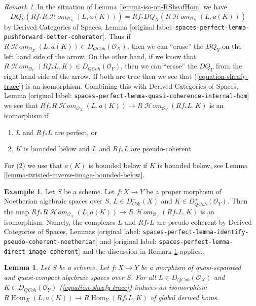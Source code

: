 \documentclass[10pt,a4paper]{article}
\theoremstyle{plain}
\newtheorem{lemma}[subsection]{Lemma}
\theoremstyle{definition}
\newtheorem{example}[subsection]{Example}
\theoremstyle{remark}
\newtheorem{remark}[subsection]{Remark}
\numberwithin{equation}{subsection}
\def\Hom{\mathop{\mathrm{Hom}}\nolimits}
\def\SheafHom{\mathop{\mathcal{H}\!\mathit{om}}\nolimits}
\def\QCoh{\mathit{QCoh}}
\begin{document}
\begin{remark}
\label{remark-iso-on-RSheafHom}
In the situation of Lemma \ref{lemma-iso-on-RSheafHom} we have
$$
DQ_Y(Rf_*R\SheafHom_{\mathcal{O}_X}(L, a(K))) =
Rf_* DQ_X(R\SheafHom_{\mathcal{O}_X}(L, a(K)))
$$
by Derived Categories of Spaces, Lemma
\textnormal{[original label: \nolinkurl{spaces-perfect-lemma-pushforward-better-coherator}]}.
Thus if $R\SheafHom_{\mathcal{O}_X}(L, a(K)) \in D_\QCoh(\mathcal{O}_X)$,
then we can ``erase'' the $DQ_Y$ on the left hand side of the arrow.
On the other hand, if we know that
$R\SheafHom_{\mathcal{O}_Y}(Rf_*L, K) \in D_\QCoh(\mathcal{O}_Y)$,
then we can ``erase'' the $DQ_Y$ from the right hand side of the arrow.
If both are true then we see that (\ref{equation-sheafy-trace})
is an isomorphism. Combining this with
Derived Categories of Spaces, Lemma
\textnormal{[original label: \nolinkurl{spaces-perfect-lemma-quasi-coherence-internal-hom}]}
we see that $Rf_*R\SheafHom_{\mathcal{O}_X}(L, a(K)) \to
R\SheafHom_{\mathcal{O}_Y}(Rf_*L, K)$ is an isomorphism if
\begin{enumerate}
\item $L$ and $Rf_*L$ are perfect, or
\item $K$ is bounded below and $L$ and $Rf_*L$ are pseudo-coherent.
\end{enumerate}
For (2) we use that $a(K)$ is bounded below if $K$
is bounded below, see Lemma \ref{lemma-twisted-inverse-image-bounded-below}.
\end{remark}

\begin{example}
\label{example-iso-on-RSheafHom-noetherian}
Let $S$ be a scheme.
Let $f : X \to Y$ be a proper morphism of Noetherian algebraic spaces
over $S$, $L \in D^-_{\textit{Coh}}(X)$ and $K \in D^+_{\QCoh}(\mathcal{O}_Y)$.
Then the map $Rf_*R\SheafHom_{\mathcal{O}_X}(L, a(K)) \to
R\SheafHom_{\mathcal{O}_Y}(Rf_*L, K)$ is an isomorphism.
Namely, the complexes $L$ and $Rf_*L$ are pseudo-coherent by
Derived Categories of Spaces, Lemmas
\textnormal{[original label: \nolinkurl{spaces-perfect-lemma-identify-pseudo-coherent-noetherian}]} and
\textnormal{[original label: \nolinkurl{spaces-perfect-lemma-direct-image-coherent}]}
and the discussion in Remark \ref{remark-iso-on-RSheafHom} applies.
\end{example}

\begin{lemma}
\label{lemma-iso-global-hom}
Let $S$ be a scheme.
Let $f : X \to Y$ be a morphism of quasi-separated and quasi-compact
algebraic spaces over $S$.
For all $L \in D_\QCoh(\mathcal{O}_X)$ and $K \in D_\QCoh(\mathcal{O}_Y)$
(\ref{equation-sheafy-trace}) induces an isomorphism
$R\Hom_X(L, a(K)) \to R\Hom_Y(Rf_*L, K)$ of global derived homs.
\end{lemma}
\end{document}
